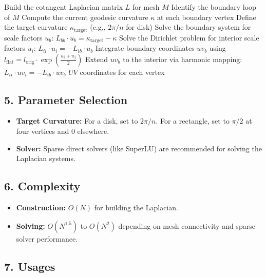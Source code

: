 \begin{algorithm}
\caption{BFF Parameterization}
\label{alg:bff_parameterization}
\begin{algorithmic}[1]
    \State Build the cotangent Laplacian matrix $L$ for mesh $M$
    \State Identify the boundary loop of $M$
    \State Compute the current geodesic curvature $\kappa$ at each boundary vertex
    \State Define the target curvature $\kappa_{\text{target}}$ (e.g., $2\pi/n$ for disk)
    \State Solve the boundary system for scale factors $u_b$: $L_{bb} \cdot u_b = \kappa_{\text{target}} - \kappa$
    \State Solve the Dirichlet problem for interior scale factors $u_i$: $L_{ii} \cdot u_i = -L_{ib} \cdot u_b$
    \State Integrate boundary coordinates $uv_b$ using $l_{\text{flat}} = l_{\text{orig}} \cdot \exp\left(\frac{u_i + u_j}{2}\right)$
    \State Extend $uv_b$ to the interior via harmonic mapping: $L_{ii} \cdot uv_i = -L_{ib} \cdot uv_b$
    \State \Return $UV$ coordinates for each vertex
\EndFunction
\end{algorithmic}
\end{algorithm}

\subsection{5. Parameter Selection}

\begin{itemize}
    \item \textbf{Target Curvature:} For a disk, set to $2\pi/n$. For a rectangle, set to $\pi/2$ at four vertices and $0$ elsewhere.
    \item \textbf{Solver:} Sparse direct solvers (like SuperLU) are recommended for solving the Laplacian systems.
\end{itemize}

\subsection{6. Complexity}

\begin{itemize}
    \item \textbf{Construction:} $O(N)$ for building the Laplacian.
    \item \textbf{Solving:} $O(N^{1.5})$ to $O(N^2)$ depending on mesh connectivity and sparse solver performance.
\end{itemize}

\subsection{7. Usages}

